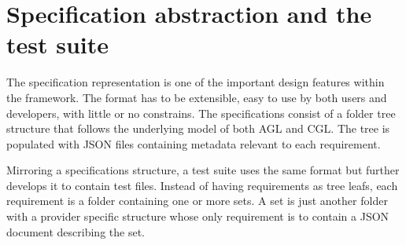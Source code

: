 \section{Specification abstraction and the test suite} \label{specs}
The specification representation is one of the important design features within the framework. The format has to be extensible, easy to use by both users and developers, with little or no constrains. The specifications consist of a folder tree structure that follows the underlying model of both AGL and CGL. The tree is populated with JSON files containing metadata relevant to each requirement.

Mirroring a specifications structure, a test suite uses the same format but further develops it to contain test files. Instead of having requirements as tree leafs, each requirement is a folder containing one or more sets. A set is just another folder with a provider specific structure whose only requirement is to contain a JSON document describing the set.

